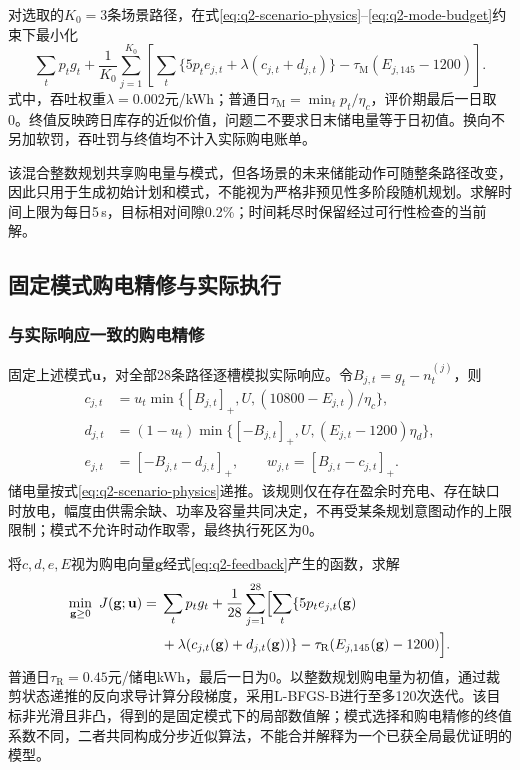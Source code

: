 对选取的$K_0=3$条场景路径，在式\eqref{eq:q2-scenario-physics}--\eqref{eq:q2-mode-budget}约束下最小化
\begin{equation}\label{eq:q2-mip-objective}
 \sum_t p_tg_t+\frac1{K_0}\sum_{j=1}^{K_0}
 \left[\sum_t\{5p_te_{j,t}+\lambda(c_{j,t}+d_{j,t})\}
 -\tau_{\mathrm M}(E_{j,145}-1200)\right].
\end{equation}
式中，吞吐权重$\lambda=0.002$元/kWh；普通日$\tau_{\mathrm M}=\min_t p_t/\eta_c$，评价期最后一日取0。终值反映跨日库存的近似价值，问题二不要求日末储电量等于日初值。换向不另加软罚，吞吐罚与终值均不计入实际购电账单。

该混合整数规划共享购电量与模式，但各场景的未来储能动作可随整条路径改变，因此只用于生成初始计划和模式，不能视为严格非预见性多阶段随机规划。求解时间上限为每日5\,s，目标相对间隙0.2\%；时间耗尽时保留经过可行性检查的当前解。

\subsection{固定模式购电精修与实际执行}
\subsubsection{与实际响应一致的购电精修}

固定上述模式$\mathbf u$，对全部28条路径逐槽模拟实际响应。令$B_{j,t}=g_t-n^{(j)}_t$，则
\begin{equation}\label{eq:q2-feedback}
 \begin{aligned}
 c_{j,t}&=u_t\min\{[B_{j,t}]_+,U,(10800-E_{j,t})/\eta_c\},\\
 d_{j,t}&=(1-u_t)\min\{[-B_{j,t}]_+,U,(E_{j,t}-1200)\eta_d\},\\
 e_{j,t}&=[-B_{j,t}-d_{j,t}]_+,\qquad
 w_{j,t}=[B_{j,t}-c_{j,t}]_+.
 \end{aligned}
\end{equation}
储电量按式\eqref{eq:q2-scenario-physics}递推。该规则仅在存在盈余时充电、存在缺口时放电，幅度由供需余缺、功率及容量共同决定，不再受某条规划意图动作的上限限制；模式不允许时动作取零，最终执行死区为0。

将$c,d,e,E$视为购电向量$\mathbf g$经式\eqref{eq:q2-feedback}产生的函数，求解
\begin{equation}\label{eq:q2-refine}
 \begin{aligned}
 \min_{\mathbf g\ge0}\ J(\mathbf g;\mathbf u)
 ={}&\sum_t p_tg_t+\frac1{28}\sum_{j=1}^{28}\Bigl[
 \sum_t\{5p_te_{j,t}(\mathbf g)\\
 &+\lambda(c_{j,t}(\mathbf g)+d_{j,t}(\mathbf g))\}
 -\tau_{\mathrm R}(E_{j,145}(\mathbf g)-1200)\Bigr].
 \end{aligned}
\end{equation}
普通日$\tau_{\mathrm R}=0.45$元/储电kWh，最后一日为0。以整数规划购电量为初值，通过裁剪状态递推的反向求导计算分段梯度，采用L-BFGS-B进行至多120次迭代。该目标非光滑且非凸，得到的是固定模式下的局部数值解；模式选择和购电精修的终值系数不同，二者共同构成分步近似算法，不能合并解释为一个已获全局最优证明的模型。

